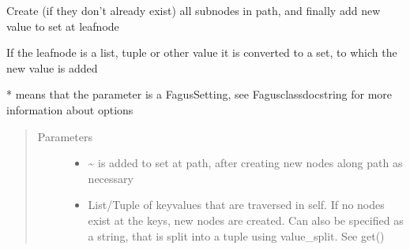 \documentclass[a4paper,10pt,english]{sphinxmanual}
\begin{document}
\begin{fulllineitems}
\begin{fulllineitems}
\label{\detokenize{fagus.fagus:fagus.fagus.Fagus.add}}
\pysigstartsignatures
{}
\pysigstopsignatures
\sphinxAtStartPar
Create (if they don’t already exist) all sub\sphinxhyphen{}nodes in path, and finally add new value to set at leaf\sphinxhyphen{}node

\sphinxAtStartPar
If the leaf\sphinxhyphen{}node is a list, tuple or other value it is converted to a set, to which the new value is added

\sphinxAtStartPar
* means that the parameter is a Fagus\sphinxhyphen{}Setting, see Fagus\sphinxhyphen{}class\sphinxhyphen{}docstring for more information about options
\begin{quote}\begin{description}
\item[{Parameters}] \leavevmode\begin{itemize}
\item {}
\sphinxAtStartPar
{} \textendash{} \textasciitilde{} is added to set at path, after creating new nodes along path as necessary

\item {}
\sphinxAtStartPar
{} \textendash{} List/Tuple of key\sphinxhyphen{}values that are traversed in self. If no nodes exist at the keys, new nodes are
created. Can also be specified as a string, that is split into a tuple using value\_split. See get()


\end{itemize}
\end{description}
\end{quote}
\end{fulllineitems}
\end{fulllineitems}
\end{document}
